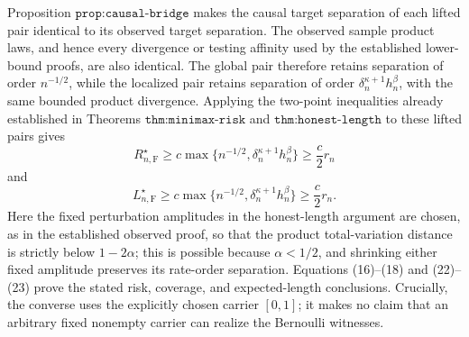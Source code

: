 Proposition \(\texttt{prop:causal-bridge}\) makes the causal target separation of each lifted pair identical to its observed target separation. The observed sample product laws, and hence every divergence or testing affinity used by the established lower-bound proofs, are also identical. The global pair therefore retains separation of order \(n^{-1/2}\), while the localized pair retains separation of order \(\delta_n^{\kappa+1}h_n^\beta\), with the same bounded product divergence. Applying the two-point inequalities already established in Theorems \(\texttt{thm:minimax-risk}\) and \(\texttt{thm:honest-length}\) to these lifted pairs gives
\[
 R_{n,\mathrm F}^\star
 \geq c\max\{n^{-1/2},\delta_n^{\kappa+1}h_n^\beta\}
 \geq \frac c2 r_n
 \tag{22}
\]
and
\[
 L_{n,\mathrm F}^\star
 \geq c\max\{n^{-1/2},\delta_n^{\kappa+1}h_n^\beta\}
 \geq \frac c2 r_n.
 \tag{23}
\]
Here the fixed perturbation amplitudes in the honest-length argument are chosen, as in the established observed proof, so that the product total-variation distance is strictly below \(1-2\alpha\); this is possible because \(\alpha<1/2\), and shrinking either fixed amplitude preserves its rate-order separation. Equations (16)--(18) and (22)--(23) prove the stated risk, coverage, and expected-length conclusions. Crucially, the converse uses the explicitly chosen carrier \([0,1]\); it makes no claim that an arbitrary fixed nonempty carrier can realize the Bernoulli witnesses.